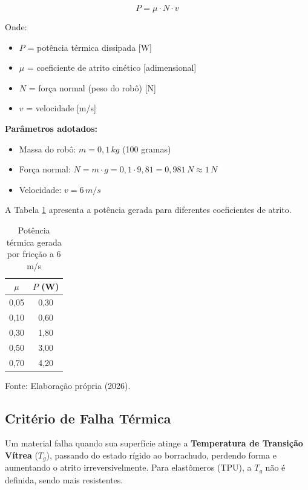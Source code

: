 \documentclass[12pt, a4paper]{article}
\newcommand{\fonte}[1]{\vspace{0.2cm}\par\noindent\fontsize{9}{11}\selectfont Fonte: #1}
\begin{document}
\begin{equation}
P = \mu \cdot N \cdot v
\end{equation}

Onde:
\begin{itemize}
    \item $P$ = potência térmica dissipada [W]
    \item $\mu$ = coeficiente de atrito cinético [adimensional]
    \item $N$ = força normal (peso do robô) [N]
    \item $v$ = velocidade [m/s]
\end{itemize}

\textbf{Parâmetros adotados:}
\begin{itemize}
    \item Massa do robô: $m = 0,1 \, kg$ (100 gramas)
    \item Força normal: $N = m \cdot g = 0,1 \cdot 9,81 = 0,981 \, N \approx 1 \, N$
    \item Velocidade: $v = 6 \, m/s$
\end{itemize}

A Tabela \ref{tab:potencia} apresenta a potência gerada para diferentes coeficientes de atrito.
\begin{table}[h]
\centering
\caption{Potência térmica gerada por fricção a 6 m/s}
\label{tab:potencia}
\begin{tabular}{c|c}
\hline
$\mu$ & $P$ (W) \\ \hline
0,05 & 0,30 \\
0,10 & 0,60 \\
0,30 & 1,80 \\
0,50 & 3,00 \\
0,70 & 4,20 \\ \hline
\end{tabular}
\fonte{Elaboração própria (2026).}
\end{table}

\subsection*{Critério de Falha Térmica}

Um material falha quando sua superfície atinge a \textbf{Temperatura de Transição Vítrea} ($T_g$), passando do estado rígido ao borrachudo, perdendo forma e aumentando o atrito irreversivelmente. Para elastômeros (TPU), a $T_g$ não é definida, sendo mais resistentes.

\end{document}
